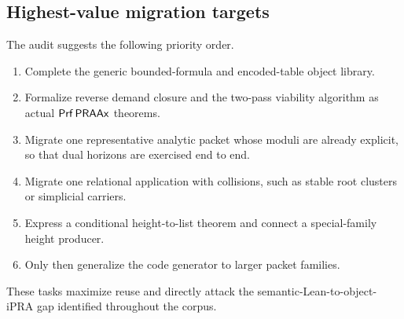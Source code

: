 \subsection{Highest-value migration targets}

The audit suggests the following priority order.

\begin{enumerate}[label=\arabic*.,leftmargin=2.2em]
\item Complete the generic bounded-formula and encoded-table object library.
\item Formalize reverse demand closure and the two-pass viability algorithm as actual
\(\mathsf{Prf}\,\mathsf{PRAAx}\) theorems.
\item Migrate one representative analytic packet whose moduli are already explicit,
so that dual horizons are exercised end to end.
\item Migrate one relational application with collisions, such as stable root clusters
or simplicial carriers.
\item Express a conditional height-to-list theorem and connect a special-family height
producer.
\item Only then generalize the code generator to larger packet families.
\end{enumerate}

These tasks maximize reuse and directly attack the semantic-Lean-to-object-iPRA gap
identified throughout the corpus.
